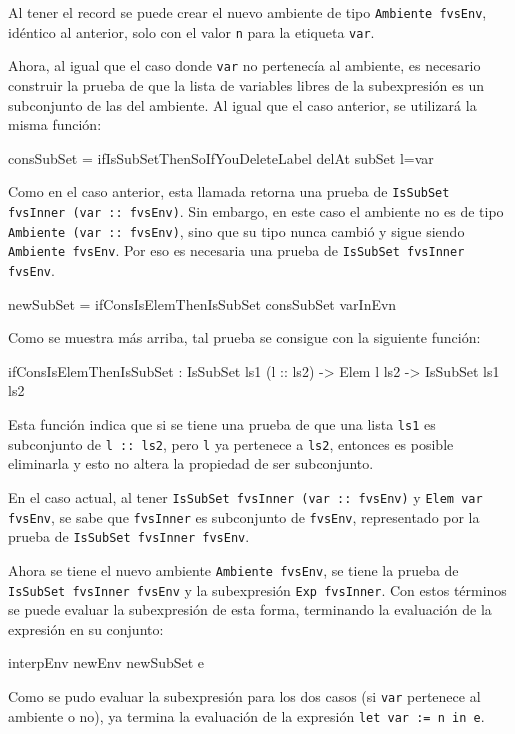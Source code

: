 Al tener el record se puede crear el nuevo ambiente de tipo \texttt{Ambiente fvsEnv}, idéntico al anterior, solo con el valor \texttt{n} para la etiqueta \texttt{var}.

Ahora, al igual que el caso donde \texttt{var} no pertenecía al ambiente, es necesario construir la prueba de que la lista de variables libres de la subexpresión es un subconjunto de las del ambiente. Al igual que el caso anterior, se utilizará la misma función:

\begin{code}
consSubSet =
  ifIsSubSetThenSoIfYouDeleteLabel delAt subSet {l=var}
\end{code}

Como en el caso anterior, esta llamada retorna una prueba de \texttt{IsSubSet fvsInner (var :: fvsEnv)}. Sin embargo, en este caso el ambiente no es de tipo \texttt{Ambiente (var :: fvsEnv)}, sino que su tipo nunca cambió y sigue siendo \texttt{Ambiente fvsEnv}. Por eso es necesaria una prueba de \texttt{IsSubSet fvsInner fvsEnv}.

\begin{code}
newSubSet = ifConsIsElemThenIsSubSet consSubSet varInEvn
\end{code}

Como se muestra más arriba, tal prueba se consigue con la siguiente función:

\begin{code}
ifConsIsElemThenIsSubSet : IsSubSet ls1 (l :: ls2) ->
  Elem l ls2 -> IsSubSet ls1 ls2
\end{code}

Esta función indica que si se tiene una prueba de que una lista \texttt{ls1} es subconjunto de \texttt{l :: ls2}, pero \texttt{l} ya pertenece a \texttt{ls2}, entonces es posible eliminarla y esto no altera la propiedad de ser subconjunto.

En el caso actual, al tener \texttt{IsSubSet fvsInner (var :: fvsEnv)} y \texttt{Elem var fvsEnv}, se sabe que \texttt{fvsInner} es subconjunto de \texttt{fvsEnv}, representado por la prueba de \texttt{IsSubSet fvsInner fvsEnv}.

Ahora se tiene el nuevo ambiente \texttt{Ambiente fvsEnv}, se tiene la prueba de \texttt{IsSubSet fvsInner fvsEnv} y la subexpresión \texttt{Exp fvsInner}. Con estos términos se puede evaluar la subexpresión de esta forma, terminando la evaluación de la expresión en su conjunto:

\begin{code}
interpEnv newEnv newSubSet e
\end{code}

Como se pudo evaluar la subexpresión para los dos casos (si \texttt{var} pertenece al ambiente o no), ya termina la evaluación de la expresión \texttt{let var := n in e}.
